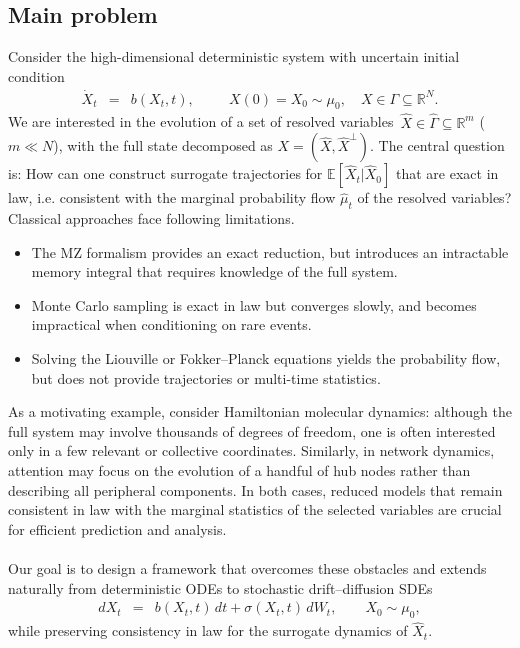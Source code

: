 \documentclass[11pt, a4paper, oneside, reqno]{amsart}
\begin{document}
\subsection{Main problem}
\noindent Consider the high-dimensional deterministic system with uncertain initial condition
\begin{eqnarray} \label{eq:ode1}
\dot{X}_t &=& b(X_t,t), \ \  \qquad X(0)=X_0 \sim \mu_0, \quad X\in\Gamma\subseteq\mathbb{R}^N.
\end{eqnarray}
We are interested in the evolution of a set of resolved variables $\,\hat{X}\in\hat{\Gamma}\subseteq\mathbb{R}^m$ ($m\ll N$), with the full state decomposed as $X=(\hat{X},\hat{X}^{\perp})$. The central question is: { How can one construct surrogate trajectories for $\mathbb{E}[\hat{X}_t|\hat{X}_0]$ that are exact in law, i.e. consistent with the marginal probability flow $\hat{\mu}_t$ of the resolved variables?}
Classical approaches face following limitations.
\begin{itemize}
\item The MZ formalism provides an exact reduction, but introduces an intractable memory integral that requires knowledge of the full system.
\item Monte Carlo sampling is exact in law but converges slowly, and becomes impractical when conditioning on rare events. 
\item Solving the Liouville or Fokker–Planck equations yields the probability flow, but does not provide trajectories or multi-time statistics.
\end{itemize}
As a motivating example, consider Hamiltonian molecular dynamics: although the full system may involve thousands of degrees of freedom, one is often interested only in a few relevant or collective coordinates. Similarly, in network dynamics, attention may focus on the evolution of a handful of hub nodes rather than describing all peripheral components. In both cases, reduced models that remain consistent in law with the marginal statistics of the selected variables are crucial for efficient prediction and analysis. \\ \ \\
Our goal is to design a framework that overcomes these obstacles and extends naturally from deterministic ODEs to stochastic drift–diffusion SDEs
\begin{eqnarray}\label{eq:sde1}
dX_t &=& b(X_t,t)\,dt + \sigma(X_t,t)\,dW_t, \qquad X_0 \sim \mu_0,
\end{eqnarray}
while preserving consistency in law for the surrogate dynamics of $\hat{X}_t$.
\end{document}
